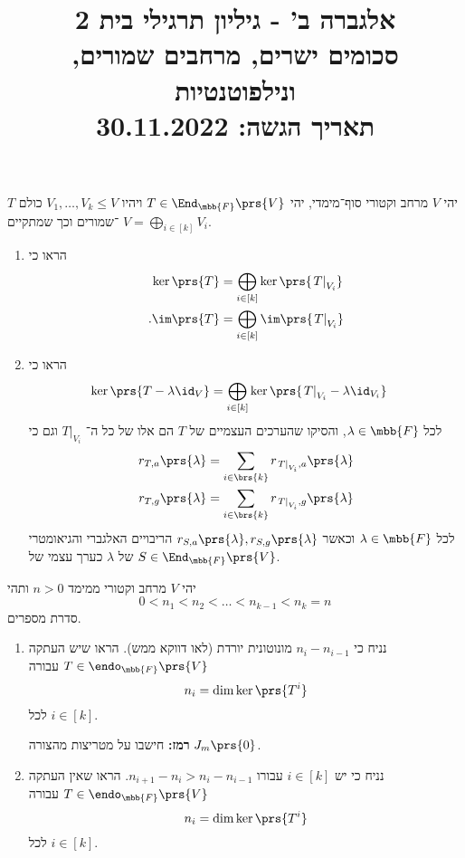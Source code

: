 \documentclass[a4paper,10pt,twoside,openany]{article}
\title{
אלגברה ב' - גיליון תרגילי בית 2 \\
סכומים ישרים, מרחבים שמורים, ונילפוטנטיות
\\
\vspace{1cm}
\large{תאריך הגשה: 30.11.2022}
}
\date{}
\begin{document}
\maketitle

\begin{exercise}
יהי
$V$
מרחב וקטורי סוף־מימדי, יהי
$T \in \End_{\mbb{F}}\prs{V}$
ויהיו
$V_1, \ldots, V_k \leq V$
כולם
$T$%
־שמורים וכך שמתקיים
$V = \bigoplus_{i \in [k]} V_i$.

\begin{enumerate}
\item 
הראו כי
\begin{align*}
\ker\prs{T} &= \bigoplus_{i \in [k]} \ker\prs{\left. T \right|_{V_i}} \\
\text{.} \im\prs{T} &= \bigoplus_{i \in [k]} \im\prs{\left. T \right|_{V_i}}
\end{align*}

\item
הראו כי
\begin{align*}
\ker\prs{T - \lambda \id_V} &= \bigoplus_{i \in [k]} \ker\prs{\left. T \right|_{V_i} - \lambda \id_{V_i}}
\end{align*}
לכל
$\lambda \in \mbb{F}$,
והסיקו שהערכים העצמיים של
$T$
הם אלו של כל ה־%
$\left. T \right|_{V_i}$
וגם כי
\begin{align*}
r_{T,a}\prs{\lambda} &= \sum_{i \in \brs{k}} r_{\left. T \right|_{V_i}, a}\prs{\lambda} \\
r_{T,g}\prs{\lambda} &= \sum_{i \in \brs{k}} r_{\left. T \right|_{V_i}, g}\prs{\lambda}
\end{align*}
לכל
$\lambda \in \mbb{F}$
וכאשר
$r_{S,a}\prs{\lambda}, r_{S,g}\prs{\lambda}$
הריבויים האלגברי והגיאומטרי של
$\lambda$
כערך עצמי של
$S \in \End_{\mbb{F}}\prs{V}$.
\end{enumerate}
\end{exercise}

\begin{exercise}
יהי
$V$
מרחב וקטורי ממימד
$n > 0$
ותהי
\[0 < n_1 < n_2 < \ldots < n_{k-1} < n_k = n\]
סדרת מספרים.

\begin{enumerate}
\item נניח כי
$n_i - n_{i-1}$
מונוטונית יורדת (לאו דווקא ממש).
הראו שיש העתקה
$T \in \endo_{\mbb{F}}\prs{V}$
עבורה
\[n_i = \dim\ker\prs{T^i}\]
לכל
$i \in [k]$.

\textbf{רמז:}
חישבו על מטריצות מהצורה
$J_m\prs{0}$.

\item נניח כי יש
$i \in [k]$
עבורו
$n_{i+1} - n_i > n_i - n_{i-1}$.
הראו שאין העתקה
$T \in \endo_{\mbb{F}}\prs{V}$
עבורה
\[n_i = \dim\ker\prs{T^i}\]
לכל
$i \in [k]$.
\end{enumerate}
\end{exercise}
\end{document}
